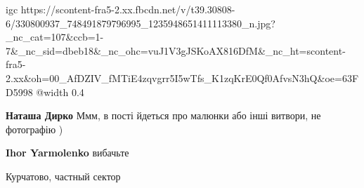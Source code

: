  
 
 
 
 

\qqSecCmt


\ifcmt
  igc https://scontent-fra5-2.xx.fbcdn.net/v/t39.30808-6/330800937_748491879796995_1235948651411113380_n.jpg?_nc_cat=107&ccb=1-7&_nc_sid=dbeb18&_nc_ohc=vuJ1V3gJSKoAX816DfM&_nc_ht=scontent-fra5-2.xx&oh=00_AfDZIV_fMTiE4zqvgrr5I5wTfs_K1zqKrE0Qf0AfvsN3hQ&oe=63FD5998
	@width 0.4
\fi

\begin{itemize} %
\textbf{Наташа Дирко} Ммм, в пості йдеться про малюнки або інші витвори, не фотографію )

\textbf{Ihor Yarmolenko} вибачьте
\end{itemize} %


Курчатово, частный сектор
